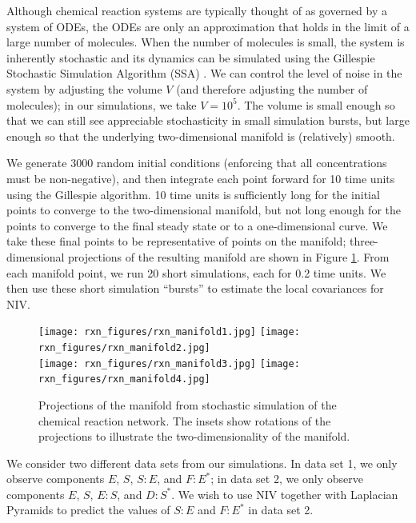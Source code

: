 \documentclass[twocolumn]{revtex4}
\begin{document}
Although chemical reaction systems are typically thought of as governed by a system of ODEs, the ODEs are only an approximation that holds in the limit of a large number of molecules.
%
When the number of molecules is small, the system is inherently stochastic and its dynamics can be simulated using the Gillespie Stochastic Simulation Algorithm (SSA) \cite{gillespie1977exact}.
%
We can control the level of noise in the system by adjusting the volume $V$ (and therefore adjusting the number of molecules); in our simulations, we take $V=10^5$.
%
The volume is small enough so that we can still see appreciable stochasticity in small simulation bursts, but large enough so that the underlying two-dimensional manifold is (relatively) smooth.

We generate 3000 random initial conditions (enforcing that all concentrations must be non-negative),
and then integrate each point forward for 10 time units using the Gillespie algorithm.
%
10 time units is sufficiently long for the initial points to converge to the two-dimensional manifold,
but not long enough for the points to converge to the final steady state or to a one-dimensional curve.
%
We take these final points to be representative of points on the manifold; three-dimensional projections of the resulting manifold are shown in Figure \ref{fig:rxn_manifolds}.
%
From each manifold point, we run 20 short simulations, each for 0.2 time units.
%
We then use these short simulation ``bursts'' to estimate the local covariances for NIV.

\begin{figure}[ht]
  \texttt{[image: rxn\_figures/rxn\_manifold1.jpg]}
  \texttt{[image: rxn\_figures/rxn\_manifold2.jpg]} \\
  \texttt{[image: rxn\_figures/rxn\_manifold3.jpg]}
  \texttt{[image: rxn\_figures/rxn\_manifold4.jpg]} \\
    \caption{Projections of the manifold from stochastic simulation of the chemical reaction network. The insets show rotations of the projections to illustrate the two-dimensionality of the manifold.}
    \label{fig:rxn_manifolds}
\end{figure}

We consider two different data sets from our simulations.
%
In data set 1, we only observe components $E$, $S$, $S:E$, and $F:E^{*}$; in data set 2, we only observe components $E$, $S$, $E:S$, and $D:S^{*}$.
%
We wish to use NIV together with Laplacian Pyramids to predict the values of $S:E$ and $F:E^{*}$ in data set 2.
\end{document}
